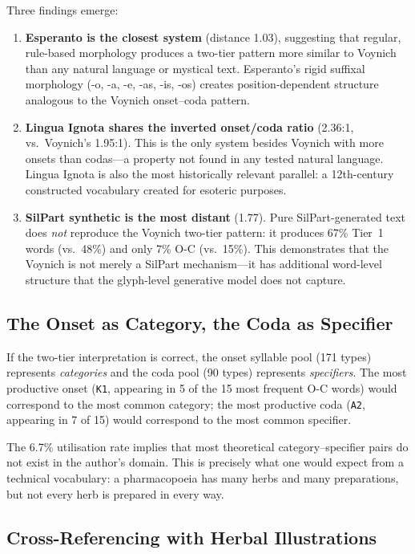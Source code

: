Three findings emerge:

\begin{enumerate}[nosep]
  \item \textbf{Esperanto is the closest system} (distance 1.03), suggesting that regular, rule-based morphology produces a two-tier pattern more similar to Voynich than any natural language or mystical text.  Esperanto's rigid suffixal morphology (-o, -a, -e, -as, -is, -os) creates position-dependent structure analogous to the Voynich onset--coda pattern.
  \item \textbf{Lingua Ignota shares the inverted onset/coda ratio} (2.36:1, vs.\ Voynich's 1.95:1).  This is the only system besides Voynich with more onsets than codas---a property not found in any tested natural language.  Lingua Ignota is also the most historically relevant parallel: a 12th-century constructed vocabulary created for esoteric purposes.
  \item \textbf{SilPart synthetic is the most distant} (1.77).  Pure SilPart-generated text does \emph{not} reproduce the Voynich two-tier pattern: it produces 67\% Tier~1 words (vs.\ 48\%) and only 7\% O-C (vs.\ 15\%).  This demonstrates that the Voynich is not merely a SilPart mechanism---it has additional word-level structure that the glyph-level generative model does not capture.
\end{enumerate}

\subsection{The Onset as Category, the Coda as Specifier}

If the two-tier interpretation is correct, the onset syllable pool (171 types) represents \emph{categories} and the coda pool (90 types) represents \emph{specifiers}.  The most productive onset (\texttt{K1}, appearing in 5 of the 15 most frequent O-C words) would correspond to the most common category; the most productive coda (\texttt{A2}, appearing in 7 of 15) would correspond to the most common specifier.

The 6.7\% utilisation rate implies that most theoretical category--specifier pairs do not exist in the author's domain.  This is precisely what one would expect from a technical vocabulary: a pharmacopoeia has many herbs and many preparations, but not every herb is prepared in every way.

\subsection{Cross-Referencing with Herbal Illustrations}

